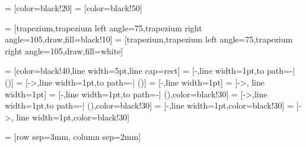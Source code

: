  = [color=black!20]
 = [color=black!50]

\newcommand{\dataRightAngle}{105}
\newcommand{\dataLeftAngle}{75}

 = [trapezium,trapezium left angle=\dataLeftAngle,trapezium right angle=\dataRightAngle,draw,fill=black!10]
 = [trapezium,trapezium left angle=\dataLeftAngle,trapezium right angle=\dataRightAngle,draw,fill=white]

 = [color=black!40,line width=5pt,line cap=rect]
 = [-,line width=1pt,to path={-| (\tikztotarget)}]
 = [->,line width=1pt,to path={-| (\tikztotarget)}]
 = [-,line width=1pt]
 = [->, line width=1pt]
 = [-,line width=1pt,to path={-| (\tikztotarget)},color=black!30]
 = [->,line width=1pt,to path={-| (\tikztotarget)},color=black!30]
 = [-,line width=1pt,color=black!30]
 = [->, line width=1pt,color=black!30]

 = [row sep=3mm, column sep=2mm]



\newcommand{\MultilineComponent}[2]
{
	\begin{minipage}{#1}
	\begin{center}
		#2
	\end{center}
	\end{minipage}
}

\newcommand{\TwolineComponent}[3]
{
	\begin{minipage}{#1}
	\begin{center}
		#2 \linebreak #3
	\end{center}
	\end{minipage}
}

\newcommand{\ThreelineComponent}[4]
{
	\begin{minipage}{#1}
	\begin{center}
		#2 \linebreak #3 \linebreak #4
	\end{center}
	\end{minipage}
}

